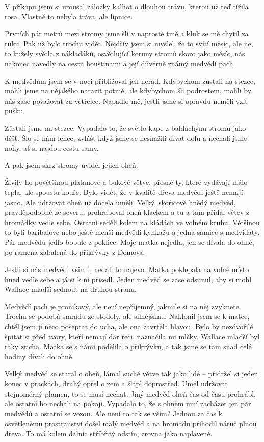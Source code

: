 V příkopu jsem si urousal záložky kalhot o dlouhou trávu, kterou už teď tížila rosa. Vlastně to nebyla tráva, ale lipnice.

Prvních pár metrů mezi stromy jsme šli v naprosté tmě a kluk se mě chytil za ruku. Pak už bylo trochu vidět. Nejdřív jsem si myslel, že to svítí měsíc, ale ne, to kužely světla z náklaďáků, osvětlující koruny stromů skoro jako měsíc, nás nakonec navedly na cestu houštinami a její důvěrně známý medvědí pach.

K medvědům jsem se v noci přibližoval jen nerad. Kdybychom zůstali na stezce, mohli jsme na nějakého narazit potmě, ale kdybychom šli podrostem, mohli by nás zase považovat za vetřelce. Napadlo mě, jestli jsme si opravdu neměli vzít pušku.

Zůstali jsme na stezce. Vypadalo to, že světlo kape z baldachýnu stromů jako déšť. Šlo se nám lehce, zvlášť když jsme se nesnažili dívat dolů a nechali jsme nohy, ať si najdou cestu samy.

A pak jsem skrz stromy uviděl jejich oheň.

\bigskip

Živily ho povětšinou platanové a bukové větve, přesně ty, které vydávají málo tepla, ale spoustu kouře. Bylo vidět, že v kvalitě dřeva medvědi ještě nemají jasno. Ale udržovat oheň už docela uměli. Velký, skořicově hnědý medvěd, pravděpodobně ze severu, prohraboval oheň klackem a tu a tam přidal větev z hromádky vedle sebe. Ostatní seděli kolem na kládách ve volném kruhu. Většinou to byli baribalové nebo ještě menší medvědi kynkažu a jedna samice s medvíďaty. Pár medvědů jedlo bobule z poklice. Moje matka nejedla, jen se dívala do ohně, po ramena zabalená do přikrývky z Domova.

Jestli si nás medvědi všimli, nedali to najevo. Matka poklepala na volné místo hned vedle sebe a já si k ní přisedl. Jeden medvěd se zase odsunul, aby si mohl Wallace mladší sednout na druhou stranu.

Medvědí pach je pronikavý, ale není nepříjemný, jakmile si na něj zvyknete. Trochu se podobá smradu ze stodoly, ale silnějšímu. Naklonil jsem se k matce, chtěl jsem jí něco pošeptat do ucha, ale ona zavrtěla hlavou.  Bylo by nezdvořilé špitat si před tvory, kteří nemají dar řeči,  naznačila mi mlčky. Wallace mladší byl taky zticha. Matka se s námi podělila o přikrývku, a tak jsme se tam snad celé hodiny dívali do ohně.

Velký medvěd se staral o oheň, lámal suché větve tak jako lidé – přidržel si jeden konec v prackách, druhý opřel o zem a šlápl doprostřed. Uměl udržovat stejnoměrný plamen, to se musí nechat. Jiný medvěd oheň čas od času prohrábl, ale ostatní ho nechali na pokoji. Vypadalo to, že s ohněm umí zacházet jen pár medvědů a ostatní se vezou. Ale není to tak se vším? Jednou za čas k osvětlenému prostranství došel malý medvěd a na hromadu přihodil náruč plnou dřeva. To má kolem dálnic stříbřitý odstín, zrovna jako naplavené.

